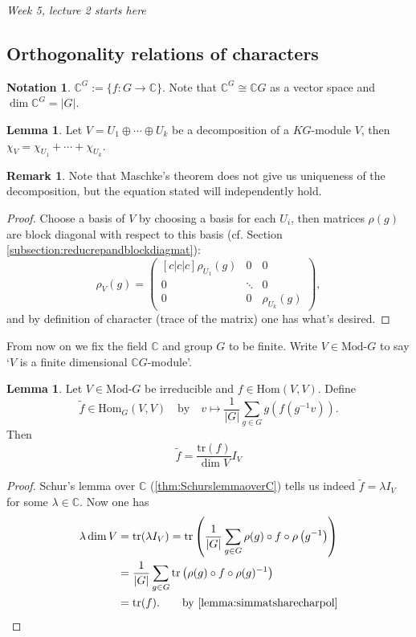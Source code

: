 \documentclass{article}
\newcommand{\tr}{\text{tr}}
\newcommand{\C}{\mathbb{C}}
\newcommand{\Hom}{\text{Hom}}
\newcommand{\Mod}{\text{Mod-}}
\theoremstyle{definition}
\newtheorem{lemma}[defn]{Lemma}
\newtheorem*{remark}{Remark}
\newtheorem*{notation}{Notation}
\begin{document}
\begin{flushright}
\textit{Week 5, lecture 2 starts here}
\end{flushright}

\subsection{Orthogonality relations of characters}
\begin{notation}
$\C^G:=\{f:G\rightarrow\C\}$. Note that $\C^G\cong \C G$ as a vector space and $\dim \C^G=|G|$.
\end{notation}

\begin{lemma}
\label{lemma:charofsumissumofchar}
Let $V=U_1\oplus\cdots\oplus U_k$ be a decomposition of a $KG$-module $V$, then $\chi_{V}=\chi_{U_1}+\cdots+\chi_{U_k}$.
\end{lemma}
\begin{remark}
Note that Maschke's theorem does not give us uniqueness of the decomposition, but the equation stated will independently hold.
\end{remark}
\begin{proof}
Choose a basis of $V$ by choosing a basis for each $U_i$, then matrices $\rho(g)$ are block diagonal with respect to this basis (cf. Section \ref{subsection:reducrepandblockdiagmat}):
\[
\rho_V(g)=\begin{pmatrix}[c|c|c]
\rho_{U_1}(g) & 0 & 0 \\ \hline
0 & \ddots & 0 \\ \hline
0 & 0 & \rho_{U_k}(g)
\end{pmatrix},
\]
and by definition of character (trace of the matrix) one has what's desired.
\end{proof}

From now on we fix the field $\C$ and group $G$ to be finite. Write $V\in\Mod G$ to say `$V$ is a finite dimensional $\C G$-module'.

\begin{lemma}
\label{lemma:ftildeistrfoverdimVIV}
Let $V\in\Mod G$ be irreducible and $f\in\Hom(V,V)$. Define
\[
\widetilde f\in\Hom_G(V,V)\quad\text{by}\quad v\mapsto \frac{1}{|G|}\sum_{g\in G}g\left(f\left(g^{-1}v\right)\right).
\]
Then
\[
\widetilde f=\frac{\tr(f)}{\dim V} I_V
\]
\end{lemma}
\begin{proof}
Schur's lemma over $\C$ (\ref{thm:SchurslemmaoverC}) tells us indeed $\widetilde f=\lambda I_V$ for some $\lambda\in\C$. Now one has
\[
\begin{aligned}
\lambda\dim V&=\tr(\lambda I_V)=\tr\left(\frac{1}{|G|}\sum_{g\in G}\rho(g)\circ f\circ \rho\left(g^{-1}\right)\right)\\
&=\frac{1}{|G|}\sum_{g\in G}\tr\left(\rho(g)\circ f\circ \rho(g)^{-1}\right)\\
&=\tr(f). \qquad \text{by \ref{lemma:simmatsharecharpol}}
\end{aligned}
\]
\end{proof}
\end{document}
